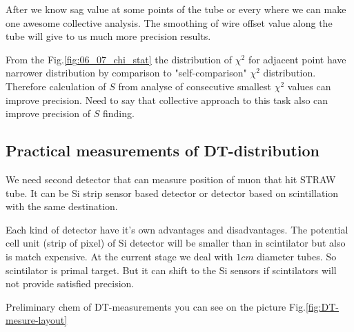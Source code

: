 	After we know sag value at some points of the tube or every where we can make one awesome collective analysis. The smoothing of wire offset value along the tube will give to us much more precision results.  
	
	From the Fig.\ref{fig:06_07_chi_stat} the distribution of $\chi^2$ for adjacent point have narrower distribution by comparison to "self-comparison" $\chi^2$ distribution. Therefore calculation of $S$ from analyse of consecutive smallest $\chi^2$ values can improve precision.
	Need to say that collective approach to this task also can improve precision of $S$ finding. 
	
	
	\subsection{Practical measurements of DT-distribution}
	
	We need second detector that can measure position of muon that hit STRAW tube. It can be Si strip sensor based detector or detector based on  scintillation with the same destination.
	
	Each kind of detector have it's own advantages and disadvantages. The potential cell unit (strip of pixel) of Si detector will be smaller than in scintilator but also is match expensive. At the current stage we deal with $1cm$ diameter tubes. So scintilator is primal target. But it can shift to the Si sensors if scintilators will not provide satisfied precision.
	
	Preliminary chem of DT-measurements you can see on the picture Fig.\ref{fig:DT-mesure-layout}
	
